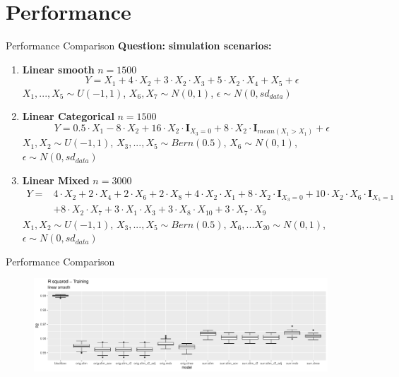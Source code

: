 \documentclass[9pt, xcolor=table]{beamer}
\begin{document}
\section{Performance}
\begin{frame}{Performance Comparison}
\textbf{Question:} 
\textbf{simulation scenarios:}
\begin{enumerate}
    \item \textbf{Linear smooth} $n= 1500$ $$ Y = X_1 + 4 \cdot X_2 + 3 \cdot X_2 \cdot X_3 + 5\cdot X_2\cdot X_4 + X_5 + \epsilon $$
    $X_1,..., X_5 \sim U(-1,1)$, $X_6, X_7 \sim N(0,1)$, $\epsilon \sim N(0, sd_{data})$
    
    \item \textbf{Linear Categorical} $n= 1500$ $$ Y =  0.5\cdot X_{1} - 8\cdot X_2 + 16\cdot X_2\cdot \mathbf{I}_{X_3 = 0} + 8\cdot X_2\cdot \mathbf{I}_{mean(X_1 > X_1)} + \epsilon $$
    $X_1, X_2 \sim U(-1,1)$, $X_3, ..., X_5 \sim Bern(0.5)$, $X_6 \sim N(0,1)$,  $\epsilon \sim N(0, sd_{data})$
    
    \item \textbf{Linear Mixed}  $n= 3000$
    \begin{align*}
    Y = & 4 \cdot X_2 + 2 \cdot X_4 + 2 \cdot X_6 + 2 \cdot X_8 + 4 \cdot X_2 \cdot X_1 + 8 \cdot X_2 \cdot \mathbf{I}_{X_3 = 0} + 10 \cdot X_2 \cdot X_6  \cdot \mathbf{I}_{X_5 = 1} \\
    & + 8 \cdot X_2 \cdot X_7 + 3 \cdot X_1 \cdot X_3 + 3 \cdot X_8 \cdot X_10 + 3 \cdot X_7 \cdot X_9     
    \end{align*}
    $X_1, X_2 \sim U(-1,1)$, $X_3, ..., X_5 \sim Bern(0.5)$, $X_6, ... X_20 \sim N(0,1)$,  $\epsilon \sim N(0, sd_{data})$
\end{enumerate}
    
\end{frame}

\begin{frame}{Performance Comparison}
\begin{figure}
    \includegraphics[width=11cm]{Figures/Performance/linear_smooth/r2_train.pdf}
\end{figure}
\end{frame}
\end{document}
